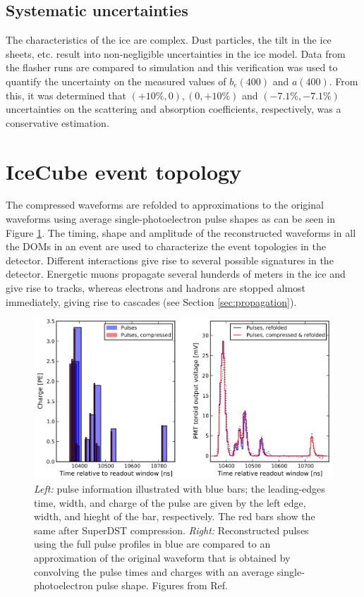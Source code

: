 \subsection{Systematic uncertainties}
The characteristics of the ice are complex. Dust particles, the tilt in the ice sheets, etc. result into non-negligible uncertainties in the ice model. Data from the flasher runs are compared to simulation and this verification was used to quantify the uncertainty on the measured values of $b_e(400)$ and $a(400)$. From this, it was determined that $(+10\%,0), (0,+10\%)$ and $(-7.1\%,-7.1\%)$ uncertainties on the scattering and absorption coefficients, respectively, was a conservative estimation.

\section{IceCube event topology}
The compressed waveforms are refolded to approximations to the original waveforms using average single-photoelectron pulse shapes as can be seen in Figure \ref{fig:waveform}. The timing, shape and amplitude of the reconstructed waveforms in all the DOMs in an event are used to characterize the event topologies in the detector. Different interactions give rise to several possible signatures in the detector. Energetic muons propagate several hunderds of meters in the ice and give rise to tracks, whereas electrons and hadrons are stopped almost immediately, giving rise to cascades (see Section \ref{sec:propagation}).

\begin{figure}[t]
\centering
\includegraphics[width=\textwidth]{chapter5/img/waveform.png}
\caption{\textit{Left:} pulse information illustrated with blue bars; the leading-edges time, width, and charge of the pulse are given by the left edge, width, and hieght of the bar, respectively. The red bars show the same after SuperDST compression. \textit{Right: }Reconstructed pulses using the full pulse profiles in blue are compared to an approximation of the original waveform that is obtained by convolving the pulse times and charges with an average single-photoelectron pulse shape. Figures from Ref. \cite{waveforms}}
\label{fig:waveform}
\end{figure}

